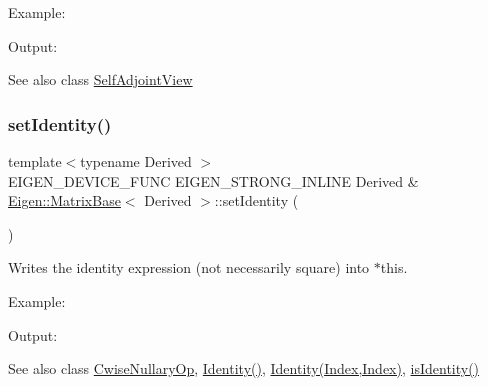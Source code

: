 Example\+: 
\begin{DoxyCodeInclude}{0}
\end{DoxyCodeInclude}
 Output\+: 
\begin{DoxyVerbInclude}
\end{DoxyVerbInclude}


\begin{DoxySeeAlso}{See also}
class \mbox{\hyperlink{class_eigen_1_1_self_adjoint_view}{Self\+Adjoint\+View}} 
\end{DoxySeeAlso}
\mbox{\label{class_eigen_1_1_matrix_base_ae05be7fcc1ade707f0b73eb5f9d8cf33}} 
\subsubsection{\texorpdfstring{setIdentity()}{setIdentity()}\hspace{0.1cm}{\footnotesize\ttfamily [1/2]}}
{\footnotesize\ttfamily template$<$typename Derived $>$ \\
E\+I\+G\+E\+N\+\_\+\+D\+E\+V\+I\+C\+E\+\_\+\+F\+U\+NC E\+I\+G\+E\+N\+\_\+\+S\+T\+R\+O\+N\+G\+\_\+\+I\+N\+L\+I\+NE Derived \& \mbox{\hyperlink{class_eigen_1_1_matrix_base}{Eigen\+::\+Matrix\+Base}}$<$ Derived $>$\+::set\+Identity (\begin{DoxyParamCaption}{ }\end{DoxyParamCaption})}

Writes the identity expression (not necessarily square) into $\ast$this.

Example\+: 
\begin{DoxyCodeInclude}{0}
\end{DoxyCodeInclude}
 Output\+: 
\begin{DoxyVerbInclude}
\end{DoxyVerbInclude}


\begin{DoxySeeAlso}{See also}
class \mbox{\hyperlink{class_eigen_1_1_cwise_nullary_op}{Cwise\+Nullary\+Op}}, \mbox{\hyperlink{class_eigen_1_1_matrix_base_a2ef43190f3aba0aef0cf1030d46d0ca7}{Identity()}}, \mbox{\hyperlink{class_eigen_1_1_matrix_base_ae717f291d83ab229ae64a4903d9f987d}{Identity(\+Index,\+Index)}}, \mbox{\hyperlink{class_eigen_1_1_matrix_base_a4ccbd8dfa06e9d47b9bf84711f8b9d40}{is\+Identity()}} 
\end{DoxySeeAlso}
\mbox{\label{class_eigen_1_1_matrix_base_a054e0ad7e745cb1b9f2e87807e4d2200}} 
